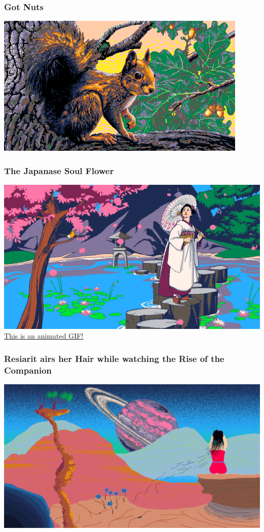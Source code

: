 \documentclass{beamer}
\begin{document}
\begin{frame}
  \frametitle{Got Nuts}
  \includegraphics[width=\textwidth]{got_nuts}
\end{frame}

\begin{frame}
  \frametitle{The Japanase Soul Flower}
  \includegraphics[width=.9\textwidth]{TheJapaneseSoulFlower_Final}\\
  \href{TheJapaneseSoulFlower_Final.gif}{This is an animated GIF!}
\end{frame}

\begin{frame}
  \frametitle{Resiarit airs her Hair while watching the Rise of the Companion}
  \href{https://files.scene.org/view/parties/2018/evoke18/pixel_graphics/animation.resiarit.gif}{\includegraphics[width=.9\textwidth]{resiarit_airs_her_hair_while_watching_the_rise_of_the_companion.png}}
\end{frame}
\end{document}
